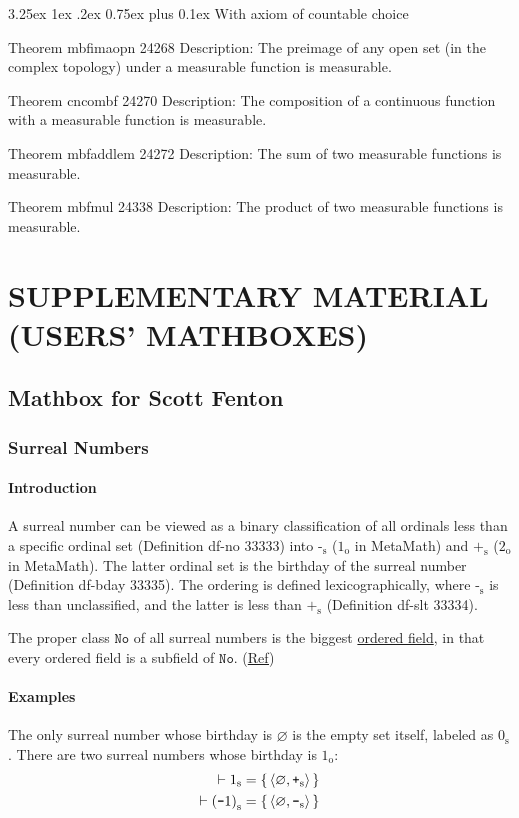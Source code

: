 \documentclass[12pt, letterpaper]{article}
\makeatletter
\renewcommand\subparagraph{\@startsection{subparagraph}{5}{\parindent}%
	{3.25ex \@plus1ex \@minus .2ex}%
	{0.75ex plus 0.1ex}%
	{\normalfont\normalsize\bfseries}}
\newcommand{\blue}[1]{{\color{blue} #1}}
\renewcommand{\emptyset}{\varnothing}
\newcommand{\provable}{\vdash}
\newcommand{\ordsuf}[1]{{#1}_{\mathrm{o}}}
\newcommand{\oneo}{\ordsuf{1}}
\newcommand{\twoo}{\ordsuf{2}}
\newcommand{\opair}[2]{\left\langle{{#1},{#2}}\right\rangle}
\newcommand{\No}{\texttt{No}}
\newcommand{\sur}[1]{{#1}_{\operatorname{s}}}
\newcommand{\sneg}{\sur{\texttt{-}}}
\newcommand{\spos}{\sur{\texttt{+}}}
\theoremstyle{definition}
\theoremstyle{remark}
\theoremstyle{definition}
\theoremstyle{plain}
\makeatother
\begin{document}
	\subparagraph{With axiom of countable choice}
	
	Theorem mbfimaopn 24268
	Description: The preimage of any open set (in the complex topology) under a measurable function is measurable.
	
	Theorem cncombf 24270
	Description: The composition of a continuous function with a measurable function is measurable.
	
	Theorem mbfaddlem 24272
	Description: The sum of two measurable functions is measurable.
	
	Theorem mbfmul 24338
	Description: The product of two measurable functions is measurable.
	
	\setcounter{section}{19}
	\section{SUPPLEMENTARY MATERIAL (USERS' MATHBOXES)}
	\setcounter{subsection}{8}
	\subsection{Mathbox for Scott Fenton}
	\setcounter{subsubsection}{20}
	\subsubsection{Surreal Numbers}
	\paragraph{Introduction}
	A surreal number can be viewed as a binary classification of all ordinals less than a specific ordinal set (Definition df-no 33333) into $\sneg$ ($\oneo$ in MetaMath) and $\spos$ ($\twoo$ in MetaMath).
	The latter ordinal set is the birthday of the surreal number (Definition df-bday 33335).
	The ordering is defined lexicographically, where $\sneg$ is less than unclassified, and the latter is less than $\spos$ (Definition df-slt 33334).
	
	\blue{The proper class $\No$ of all surreal numbers is the biggest \href{https://en.wikipedia.org/wiki/Ordered_field}{ordered field}, in that every ordered field is a subfield of $\No$.} (\href{https://en.wikipedia.org/wiki/Surreal_number#Arithmetic_closure}{Ref})
	
	\paragraph{Examples}
	The only surreal number whose birthday is $\emptyset$ is the empty set itself, labeled as $\sur{0}$.
	There are two surreal numbers whose birthday is $\oneo$:
	\[
	\begin{aligned}
		\provable \sur{1} &=\set{\opair{\emptyset}{\spos}}\\
		\provable \sur{(\texttt{-}1)} &=\set{\opair{\emptyset}{\sneg}}\\
	\end{aligned}
	\]
	
\end{document}
